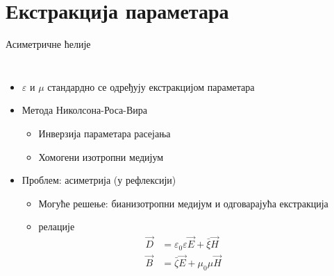 \documentclass{beamer}
\begin{document}
\section{Екстракција параметара}

\begin{frame}[t]{Асиметричне ћелије}
    \begin{columns}[c]

        \begin{itemize}
            \item $\varepsilon$ и $\mu$ стандардно се одређују екстракцијом параметара
            \item Метода Николсона-Роса-Вира
                \begin{itemize}
                    \item Инверзија параметара расејања
                    \item Хомогени изотропни медијум
                \end{itemize}
            \item Проблем: асиметрија (у рефлексији)
                \begin{itemize}
                    \item Могуће решење: бианизотропни медијум и одговарајућа екстракција
                    \item релације
                        \begin{equation*}\label{const}
                            \begin{split}
                                \vec{D} & = \varepsilon_0\varepsilon \vec{E} + \bar{\xi}\vec{H}\\
                                \vec{B} & = \bar{\zeta} \vec{E} + \mu_0\mu \vec{H}
                            \end{split}
                        \end{equation*}
                \end{itemize}
        \end{itemize}



\end{columns}
\end{frame}
\end{document}
